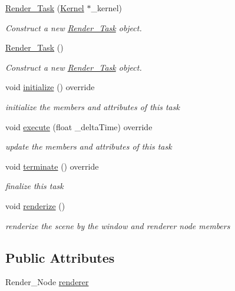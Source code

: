 \begin{DoxyCompactItemize}
\item 
\mbox{\hyperlink{classbanita_1_1_render___task_a1b8ba204040888c1b9487cd2d08e2e3d}{Render\+\_\+\+Task}} (\mbox{\hyperlink{classbanita_1_1_kernel}{Kernel}} $\ast$\+\_\+kernel)
\begin{DoxyCompactList}\small\item\em Construct a new \mbox{\hyperlink{classbanita_1_1_render___task}{Render\+\_\+\+Task}} object. \end{DoxyCompactList}\item 
\mbox{\hyperlink{classbanita_1_1_render___task_a556e9242d3cf844f11790daa616e6036}{Render\+\_\+\+Task}} ()
\begin{DoxyCompactList}\small\item\em Construct a new \mbox{\hyperlink{classbanita_1_1_render___task}{Render\+\_\+\+Task}} object. \end{DoxyCompactList}\item 
void \mbox{\hyperlink{classbanita_1_1_render___task_a34f649b5ad434cf7f6bb04604173afed}{initialize}} () override
\begin{DoxyCompactList}\small\item\em initialize the members and attributes of this task \end{DoxyCompactList}\item 
void \mbox{\hyperlink{classbanita_1_1_render___task_a94a8e1921a653ec6da9d1797ad2abcab}{execute}} (float \+\_\+delta\+Time) override
\begin{DoxyCompactList}\small\item\em update the members and attributes of this task \end{DoxyCompactList}\item 
void \mbox{\hyperlink{classbanita_1_1_render___task_a7518f53ea9050d2312f02ba0389188c6}{terminate}} () override
\begin{DoxyCompactList}\small\item\em finalize this task \end{DoxyCompactList}\item 
void \mbox{\hyperlink{classbanita_1_1_render___task_af909021398c0b93207f2502d172138bf}{renderize}} ()
\begin{DoxyCompactList}\small\item\em renderize the scene by the window and renderer node members \end{DoxyCompactList}\end{DoxyCompactItemize}
\subsection*{Public Attributes}
\begin{DoxyCompactItemize}
\item 
Render\+\_\+\+Node \mbox{\hyperlink{classbanita_1_1_render___task_ac90f3e16c8bafe5644de67226231a8ab}{renderer}}
\end{DoxyCompactItemize}
